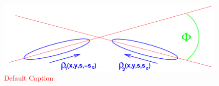 \begin{figure}
\begin{center}
\includegraphics[width=\linewidth,height=\textheight,keepaspectratio]{./figures/xing_bunch}
\caption{ \textcolor{red}{Default Caption} }
\label{fig:xing_bunch}
\end{center}
\end{figure}
